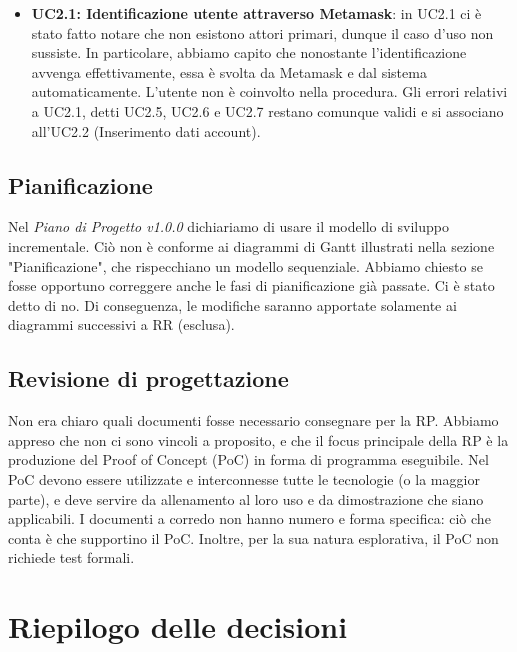 \begin{itemize}
	\item \textbf{UC2.1: Identificazione utente attraverso Metamask}: in UC2.1 ci è stato fatto notare che non esistono attori primari, dunque il caso d'uso non sussiste. In particolare, abbiamo capito che nonostante l'identificazione avvenga effettivamente, essa è svolta da Metamask e dal sistema automaticamente. L'utente non è coinvolto nella procedura. Gli errori relativi a UC2.1, detti UC2.5, UC2.6 e UC2.7 restano comunque validi e si associano all'UC2.2 (Inserimento dati account).
	
\end{itemize}

\subsection{Pianificazione}
Nel \textit{Piano di Progetto v1.0.0} dichiariamo di usare il modello di sviluppo incrementale. Ciò non è conforme ai diagrammi di Gantt illustrati nella sezione "Pianificazione", che rispecchiano un modello sequenziale. Abbiamo chiesto se fosse opportuno correggere anche le fasi di pianificazione già passate. Ci è stato detto di no. Di conseguenza, le modifiche saranno apportate solamente ai diagrammi successivi a RR (esclusa).

\subsection{Revisione di progettazione}
Non era chiaro quali documenti fosse necessario consegnare per la RP. Abbiamo appreso che non ci sono vincoli a proposito, e che il focus principale della RP è la produzione del Proof of Concept (PoC) in forma di programma eseguibile. Nel PoC devono essere utilizzate e interconnesse tutte le tecnologie (o la maggior parte), e deve servire da allenamento al loro uso e da dimostrazione che siano applicabili. I documenti a corredo non hanno numero e forma specifica: ciò che conta è che supportino il PoC.
Inoltre, per la sua natura esplorativa, il PoC non richiede test formali.


\pagebreak

\section{Riepilogo delle decisioni}

	
